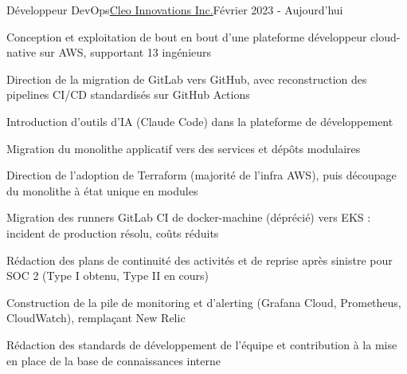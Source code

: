 \begin{joblong}{Développeur DevOps}{\href{https://www.cleo.eco}{Cleo Innovations Inc.}}{Février 2023 - Aujourd'hui}
\item Conception et exploitation de bout en bout d'une plateforme développeur cloud-native sur AWS, supportant 13 ingénieurs
\item Direction de la migration de GitLab vers GitHub, avec reconstruction des pipelines CI/CD standardisés sur GitHub Actions
\item Introduction d'outils d'IA (Claude Code) dans la plateforme de développement
\item Migration du monolithe applicatif vers des services et dépôts modulaires
\item Direction de l'adoption de Terraform (majorité de l'infra AWS), puis découpage du monolithe à état unique en modules
\item Migration des runners GitLab CI de docker-machine (déprécié) vers EKS : incident de production résolu, coûts réduits
\item Rédaction des plans de continuité des activités et de reprise après sinistre pour SOC 2 (Type I obtenu, Type II en cours)
\item Construction de la pile de monitoring et d'alerting (Grafana Cloud, Prometheus, CloudWatch), remplaçant New Relic
\item Rédaction des standards de développement de l'équipe et contribution à la mise en place de la base de connaissances interne
\end{joblong}
